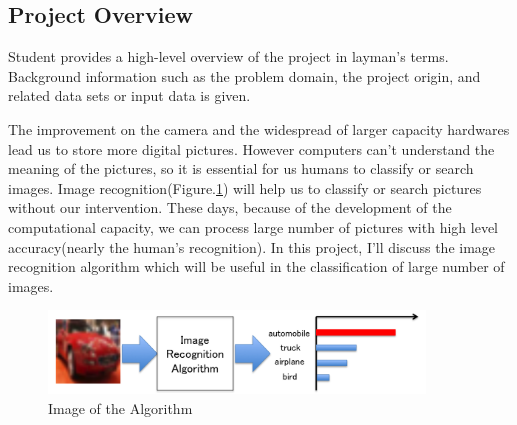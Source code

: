 \subsection{Project Overview}
Student provides a high-level overview of the project in layman’s terms. Background information such as the problem domain, the project origin, and related data sets or input data is given.

The improvement on the camera and the widespread of larger capacity hardwares lead us to store more digital pictures. However computers can't understand the meaning of the pictures, so it is essential for us humans to classify or search images. Image recognition(Figure.\ref{fig:one}) will help us to classify or search pictures without our intervention. These days, because of the development of the computational capacity, we can process large number of pictures with high level accuracy(nearly the human's recognition). In this project, I'll discuss the image recognition algorithm which will be useful in the classification of large number of images.


\begin{figure}[htbp]

\begin{center}
\includegraphics[width=10cm]{picture/Image_Recognition.png}
\end{center}
\caption{Image of the Algorithm}
\label{fig:one}

\end{figure}

